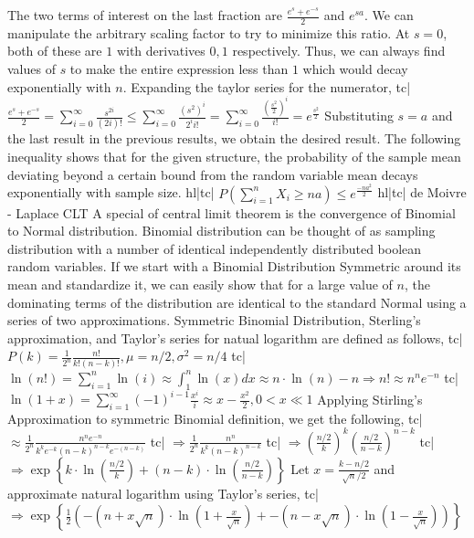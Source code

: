 The two terms of interest on the last fraction are \(\frac{e^s+e^{-s}}{2}\) and \(e^{sa}\). We can manipulate the arbitrary scaling factor to try to minimize this ratio. At \(s=0\), both of these are \(1\) with derivatives \(0,1\) respectively. Thus, we can always find values of \(s\) to make the entire expression less than \(1\) which would decay exponentially with \(n\).
Expanding the taylor series for the numerator,
tc| \( \frac{e^s+e^{-s}}{2} = \sum_{i=0}^\infty \frac{s^{2i}}{(2i)!} \le \sum_{i=0}^\infty \frac{\left(s^2\right)^i}{2^ii!} = \sum_{i=0}^\infty \frac{\left(\frac{s^2}{2}\right)^i}{i!} = e^\frac{s^2}{2}\)
Substituting \(s=a\) and the last result in the previous results, we obtain the desired result. The following inequality shows that for the given structure, the probability of the sample mean deviating beyond a certain bound from the random variable mean decays exponentially with sample size.
hl|tc| \( P(\sum_{i=1}^n X_i \ge na) \le e^{\frac{-na^2}{2}} \)
hl|tc| de Moivre - Laplace CLT
A special of central limit theorem is the convergence of Binomial to Normal distribution. Binomial distribution can be thought of as sampling distribution with a number of identical independently distributed boolean random variables.
If we start with a Binomial Distribution Symmetric around its mean and standardize it, we can easily show that for a large value of \(n\), the dominating terms of the distribution are identical to the standard Normal using a series of two approximations.
Symmetric Binomial Distribution, Sterling's approximation, and Taylor's series for natual logarithm are defined as follows,
tc| \( P(k) = \frac{1}{2^n} \frac{n!}{k!(n-k)!}, \mu = n/2, \sigma^2 = n/4 \)
tc| \( \ln(n!) = \sum_{i=1}^{n} \ln(i) \approx \int^n_1 \ln(x) dx \approx n \cdot \ln(n) - n \Rightarrow n! \approx n^n e^{-n} \)
tc| \( \ln(1+x) = \sum_{i=1}^{\infty} {(-1)}^{i-1}\frac{x^i}{i} \approx x - \frac{x^2}{2}, 0 \lt x \ll 1 \)
Applying Stirling's Approximation to symmetric Binomial definition, we get the following,
tc| \( \approx \frac{1}{2^n} \frac{n^n e^{-n}}{k^k e^{-k} (n-k)^{n-k} e^{-(n-k)}} \)
tc| \( \Rightarrow \frac{1}{2^n} \frac{n^n}{k^k(n-k)^{n-k}} \)
tc| \( \Rightarrow \left(\frac{n/2}{k}\right)^k \left(\frac{n/2}{n-k}\right)^{n-k} \)
tc| \( \Rightarrow \exp\left\{ k \cdot \ln\left(\frac{n/2}{k}\right) + (n-k) \cdot \ln\left(\frac{n/2}{n-k}\right) \right\} \)
Let \(x = \frac{k - n/2}{\sqrt{n}/2}\) and approximate natural logarithm using Taylor's series,
tc| \( \Rightarrow \exp\left\{\frac{1}{2}\left(-(n + x\sqrt{n}) \cdot \ln\left(1+\frac{x}{\sqrt{n}}\right) + -(n - x\sqrt{n}) \cdot \ln\left(1-\frac{x}{\sqrt{n}}\right) \right)\right\} \)
